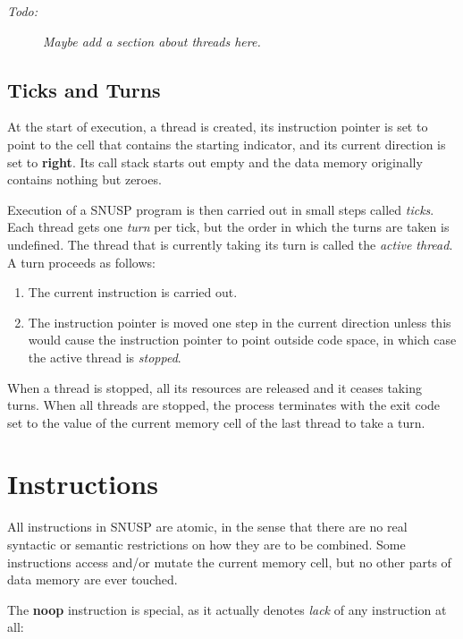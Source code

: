 \documentclass[a4paper]{article}
\newcommand\comment[2]{\begin{description} \item[#1] #2 \end{description}}
\newcommand\todo[1]{{\comment{\textit{Todo:}}{\it #1}}}
\begin{document}
\todo{Maybe add a section about threads here.}


\subsection{Ticks and Turns}

At the start of execution, a thread is created, its instruction pointer is set
to point to the cell that contains the starting indicator, and its current
direction is set to \textbf{right}.  Its call stack starts out empty and the
data memory originally contains nothing but zeroes.

Execution of a \textsc{SNUSP} program is then carried out in small steps
called \emph{ticks}.  Each thread gets one \emph{turn} per tick, but the order
in which the turns are taken is undefined.  The thread that is currently
taking its turn is called the \emph{active thread}.  A turn proceeds as
follows:

\begin{enumerate}

\item The current instruction is carried out.

\item The instruction pointer is moved one step in the current direction
unless this would cause the instruction pointer to point outside code space,
in which case the active thread is \emph{stopped}.

\end{enumerate}

When a thread is stopped, all its resources are released and it ceases taking
turns.  When all threads are stopped, the process terminates with the exit
code set to the value of the current memory cell of the last thread to take a
turn.




\section{Instructions}

All instructions in \textsc{SNUSP} are atomic, in the sense that there are no
real syntactic or semantic restrictions on how they are to be combined.  Some
instructions access and/or mutate the current memory cell, but no other parts
of data memory are ever touched.

The \textbf{noop} instruction is special, as it actually denotes \emph{lack}
of any instruction at all:
\end{document}
